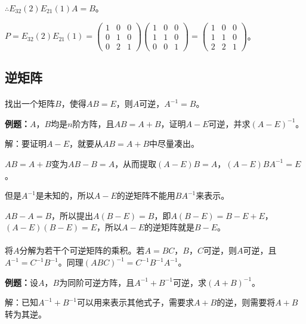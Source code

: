 $\therefore E_{32}(2)E_{21}(1)A=B$。

$P=E_{32}(2)E_{21}(1)=\left(\begin{array}{ccc}
    1 & 0 & 0 \\
    0 & 1 & 0 \\
    0 & 2 & 1
\end{array}\right)\left(\begin{array}{ccc}
    1 & 0 & 0 \\
    1 & 1 & 0 \\
    0 & 0 & 1
\end{array}\right)=\left(\begin{array}{ccc}
    1 & 0 & 0 \\
    1 & 1 & 0 \\
    2 & 2 & 1
\end{array}\right)$。

\subsection{逆矩阵}

\paragraph{}

找出一个矩阵$B$，使得$AB=E$，则$A$可逆，$A^{-1}=B$。

\textbf{例题：}$A$，$B$均是$n$阶方阵，且$AB=A+B$，证明$A-E$可逆，并求$(A-E)^{-1}$。

解：要证明$A-E$，就要从$AB=A+B$中尽量凑出。

$AB=A+B$变为$AB-B=A$，从而提取$(A-E)B=A$，$(A-E)BA^{-1}=E$。

但是$A^{-1}$是未知的，所以$A-E$的逆矩阵不能用$BA^{-1}$来表示。

$AB-A=B$，所以提出$A(B-E)=B$，即$A(B-E)=B-E+E$，$(A-E)(B-E)=E$，所以$A-E$的逆矩阵就是$B-E$。

\paragraph{}

将$A$分解为若干个可逆矩阵的乘积。若$A=BC$，$B$，$C$可逆，则$A$可逆，且$A^{-1}=C^{-1}B^{-1}$。同理$(ABC)^{-1}=C^{-1}B^{-1}A^{-1}$。

\textbf{例题：}设$A$，$B$为同阶可逆方阵，且$A^{-1}+B^{-1}$可逆，求$(A+B)^{-1}$。

解：已知$A^{-1}+B^{-1}$可以用来表示其他式子，需要求$A+B$的逆，则需要将$A+B$转为其逆。

